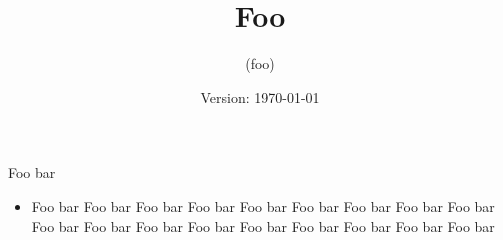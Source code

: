 \documentclass[a4,article]{seminar}
\begin{document}
\begin{slide}
\centerslidestrue
\begin{center}
\title{\LARGE Foo}
\author{(foo)}
\date{Version: \rm\today}
\maketitle

\vspace{2ex}
Foo bar\\

\end{center}
\end{slide}

\begin{itemize}
\item Foo bar Foo bar Foo bar Foo bar Foo bar Foo bar Foo bar Foo bar Foo bar
Foo bar Foo bar Foo bar Foo bar Foo bar Foo bar Foo bar Foo bar Foo bar
\end{itemize}
\end{document}
